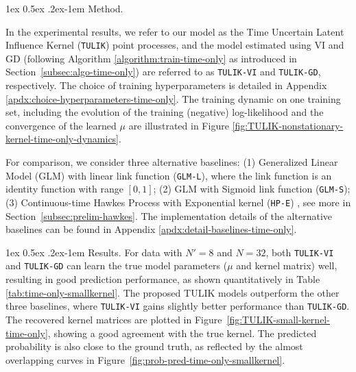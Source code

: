 \documentclass[11pt]{article}
\makeatletter
\theoremstyle{remark}
\theoremstyle{plain}
\renewcommand{\paragraph}{%
  \@startsection{paragraph}{4}%
  {\z@}{1ex \@plus 0.5ex \@minus .2ex}{-1em}%
  {\normalfont\normalsize\itshape}%
}
\makeatother
\begin{document}
\paragraph{Method.}

In the experimental results, we refer to our model as the Time Uncertain Latent Influence Kernel (\texttt{TULIK}) point processes, and the model estimated using VI and GD (following Algorithm \ref{algorithm:train-time-only} as introduced in Section~\ref{subsec:algo-time-only}) are referred to as \texttt{TULIK-VI} and \texttt{TULIK-GD}, respectively.
%
The choice of training hyperparameters is detailed in Appendix \ref{apdx:choice-hyperparameters-time-only}.
The training dynamic on one training set, including the evolution of the training (negative) log-likelihood and the convergence of the learned $\mu$ are illustrated in Figure \ref{fig:TULIK-nonstationary-kernel-time-only-dynamics}. 


For comparison, we consider three alternative baselines: 
(1) Generalized Linear Model (GLM) \cite{juditsky2020convex}
with linear link function (\texttt{GLM-L}), 
where the link function is an identity function with range $[0,1]$; 
(2) GLM with Sigmoid link function (\texttt{GLM-S}); 
(3) Continuous-time Hawkes Process with Exponential kernel (\texttt{HP-E}) \cite{hawkes1971point,hawkes1971spectra,hawkes1974cluster}, see more in Section~\ref{subsec:prelim-hawkes}. 
The implementation details of the alternative baselines can be found in Appendix \ref{apdx:detail-baselines-time-only}. 



 

\paragraph{Results.}
For data with $N'=8$ and $N=32$, both \texttt{TULIK-VI} and \texttt{TULIK-GD} can learn the true model parameters ($\mu$ and kernel matrix) well, resulting in good prediction performance, as shown quantitatively in Table \ref{tab:time-only-smallkernel}.
The proposed TULIK models outperform the other three baselines, where  \texttt{TULIK-VI} gains slightly better performance than  \texttt{TULIK-GD}. 
%
The recovered kernel matrices are plotted in Figure~\ref{fig:TULIK-small-kernel-time-only}, showing a good agreement with the true kernel. 
%
The predicted probability is also close to the ground truth, as reflected by the almost overlapping curves in Figure~\ref{fig:prob-pred-time-only-smallkernel}. 
\end{document}
